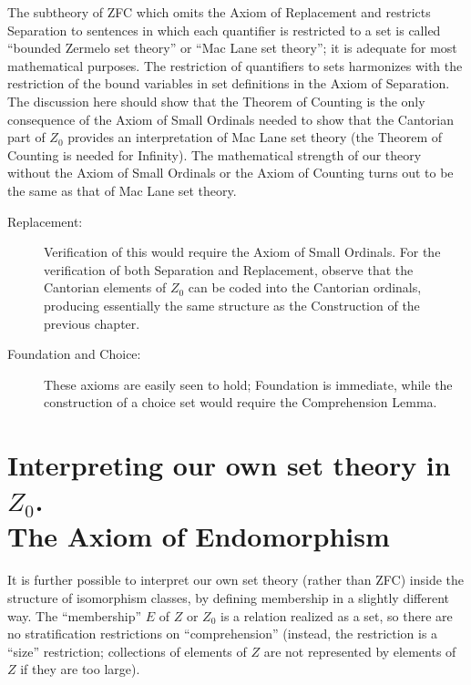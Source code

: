 The
subtheory of ZFC which omits the Axiom of
Replacement and
restricts Separation to sentences in which each quantifier is
restricted to a set is called ``bounded Zermelo set theory'' or ``Mac
Lane set theory''; it is adequate for most mathematical purposes.  The
restriction of quantifiers to sets harmonizes with the restriction of
the bound variables in set definitions in the Axiom of
Separation. The 
discussion here should show that the Theorem of Counting is the only 
consequence of the Axiom of Small Ordinals
needed to show that the 
Cantorian part of $Z_0$ provides an
interpretation of Mac Lane set 
theory (the Theorem of Counting is needed for Infinity).  The
mathematical strength of our theory without the Axiom of Small
Ordinals or the Axiom of Counting turns out to be the same as that of
Mac Lane set theory.

\begin{description}
 \item[\fdescr Replacement:] Verification of
   this would require the Axiom of Small Ordinals.  For the verification of both Separation and 
   Replacement, observe that the Cantorian elements of $Z_0$ can be coded
   into the Cantorian ordinals,
   producing essentially the same structure as the Construction of the previous
   chapter.

 \item[\fdescr Foundation and
   Choice:] These axioms are easily seen to hold; 
   Foundation is immediate, while the construction of a choice set would
   require the Comprehension Lemma.
\end{description}




\section[Our set theory in $Z_0$] {Interpreting our own set theory in
$Z_0$.\\
The Axiom of Endomorphism}

It is further possible to interpret our own set theory (rather than
ZFC) inside the structure of isomorphism
classes, by defining 
membership in a slightly different way.  The ``membership''
$E$ of $Z$ or $Z_0$ is a relation realized as a set, so there are no
stratification restrictions on
``comprehension'' (instead, the 
restriction is a ``size'' restriction; collections of elements of $Z$
are not represented by elements of $Z$ if they are too large).

